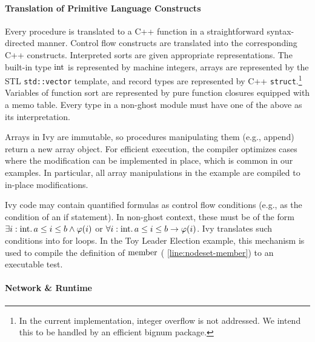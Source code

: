 \paragraph{Translation of Primitive Language Constructs}

Every procedure is translated to a C++ function in a straightforward syntax-directed manner.
Control flow constructs are translated into the corresponding C++
constructs. Interpreted sorts are given appropriate representations. The
built-in type ${\text{int}}$ is represented by machine integers, arrays are represented by the STL
\texttt{std::vector} template, and record types are represented by
C++ \texttt{struct}.\footnote{In the current implementation, integer overflow is not addressed. We intend this
  to be handled by an efficient bignum package.} Variables of function sort are represented
by pure function closures equipped with a memo table.
Every type in a non-ghost module must have one of the
above as its interpretation.

 Arrays in Ivy are
immutable, so procedures manipulating them (e.g., append) return a new
array object. For efficient execution, the compiler optimizes cases
where the modification can be implemented in place, which is common in
our examples. In particular, all array manipulations in the {\Toy}
example are compiled to in-place modifications.

Ivy code may contain quantified formulas as control flow conditions
(e.g., as the condition of an if statement). In non-ghost context,
these must be of the form $\exists i:{\text{int}}. \, a \leq i \leq b
\land \varphi(i)$ or $\forall i:{\text{int}}. \, a \leq i \leq b \to
\varphi(i)$. Ivy translates such conditions into for loops.  In the
Toy Leader Election example, this mechanism is used to compile the
definition of ${\text{member}}$ (
\cref{line:nodeset-member}) to an executable test.

\paragraph{Network \& Runtime}

